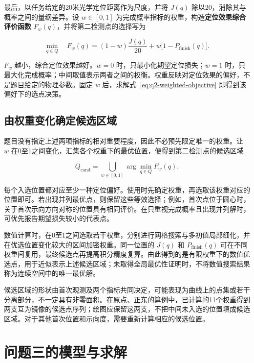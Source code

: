 \documentclass[UTF8,a4paper,zihao=-4,fontset=none]{ctexart}
\begin{document}
最后，以任务给定的20米光学定位距离作为尺度，并将 \(J(q)\) 除以20，消除其与概率之间的量纲差异。设 \(w\in[0,1]\) 为完成概率指标的权重，构造\textbf{定位效果综合评价函数} \(F_w(q)\)，并将第二检测点的选择写为

\begin{equation}
 \min_{q\in Q}\quad F_w(q)
 =(1-w)\frac{J(q)}{20}+w\bigl[1-P_{\mathrm{finish}}(q)\bigr].
\label{eq:q2-weighted-objective}
\end{equation}

\(F_w\) 越小，综合定位效果越好。\(w=0\) 时，只最小化期望定位损失；\(w=1\) 时，只最大化完成概率；中间取值表示两者之间的权衡。权重反映对定位效果的偏好，不是题目给定的物理参数。固定 \(w\) 后，求解式~\eqref{eq:q2-weighted-objective} 即得到该偏好下的选点决策。

\subsection{由权重变化确定候选区域}

题目没有指定上述两项指标的相对重要程度，因此不必预先限定唯一的权重。让 \(w\) 在0至1之间变化，汇集各个权重下的最优位置，便得到第二检测点的候选区域

\begin{equation}
 Q_{\mathrm{cand}}=\bigcup_{w\in[0,1]}\arg\min_{q\in Q}F_w(q).
\label{eq:q2-candidate-region}
\end{equation}

每个入选位置都对应至少一种定位偏好。使用时先确定权重，再选取该权重对应的位置即可。若出现并列最优点，则保留这些等效选择；例如，首次点位于圆心时，关于首次示向方向对称的位置具有相同评价。在只重视完成概率且出现并列解时，可优先报告期望损失较小的代表点。

数值计算时，在0至1之间选取若干权重，分别进行网格搜索与多初值局部细化，并在优选位置变化较大的区间加密权重。同一位置的 \(J(q)\) 和 \(P_{\mathrm{finish}}(q)\) 可在不同权重间复用，最终候选点再提高积分精度复算。由此得到的是有限权重下的数值优选点，用于近似表示上述候选区域；未取得全局最优性证明时，不将数值搜索结果称为连续空间中的唯一最优解。

候选区域的形状由首次观测及两个指标共同决定，可能表现为曲线上的点集或若干分离部分，不一定具有非零面积。在原点、正东的算例中，已计算的11个权重得到两支互为镜像的候选点序列；绘图应保留这两支，不把中间未入选的位置填成候选区域。对于其他首次位置和示向度，需要重新计算相应的候选位置。

\section{问题三的模型与求解}
\end{document}
